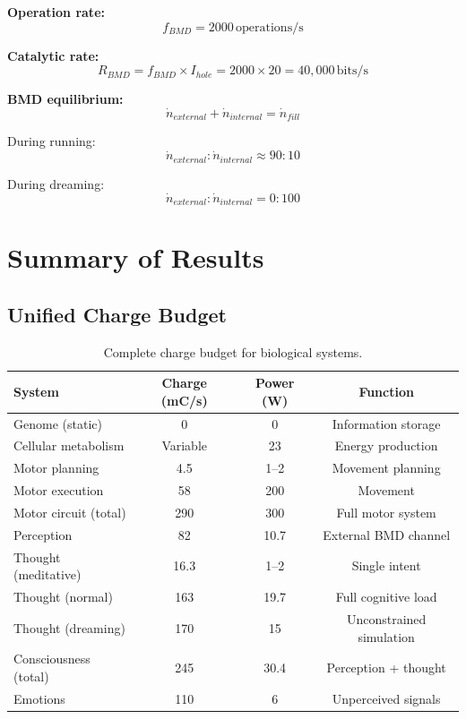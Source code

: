 \documentclass[12pt,a4paper]{article}
\begin{document}
\textbf{Operation rate:}
\begin{equation}
f_{BMD} = 2000 \, \text{operations/s}
\end{equation}

\textbf{Catalytic rate:}
\begin{equation}
R_{BMD} = f_{BMD} \times I_{hole} = 2000 \times 20 = 40{,}000 \, \text{bits/s}
\end{equation}

\textbf{BMD equilibrium:}
\begin{equation}
\dot{n}_{external} + \dot{n}_{internal} = \dot{n}_{fill}
\end{equation}

During running:
\begin{equation}
\dot{n}_{external} : \dot{n}_{internal} \approx 90 : 10
\end{equation}

During dreaming:
\begin{equation}
\dot{n}_{external} : \dot{n}_{internal} = 0 : 100
\end{equation}

\section{Summary of Results}

\subsection{Unified Charge Budget}

\begin{table}[h]
\centering
\begin{tabular}{lccc}
\toprule
\textbf{System} & \textbf{Charge (mC/s)} & \textbf{Power (W)} & \textbf{Function} \\
\midrule
Genome (static) & 0 & 0 & Information storage \\
Cellular metabolism & Variable & 23 & Energy production \\
Motor planning & 4.5 & 1--2 & Movement planning \\
Motor execution & 58 & 200 & Movement \\
Motor circuit (total) & 290 & 300 & Full motor system \\
Perception & 82 & 10.7 & External BMD channel \\
Thought (meditative) & 16.3 & 1--2 & Single intent \\
Thought (normal) & 163 & 19.7 & Full cognitive load \\
Thought (dreaming) & 170 & 15 & Unconstrained simulation \\
Consciousness (total) & 245 & 30.4 & Perception + thought \\
Emotions & 110 & 6 & Unperceived signals \\
\bottomrule
\end{tabular}
\caption{Complete charge budget for biological systems.}
\label{tab:chargebudget}
\end{table}
\end{document}
